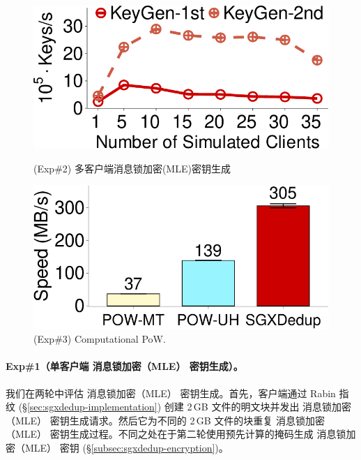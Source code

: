 \begin{figure}[!htb]
  \begin{minipage}[t]{0.47\textwidth}
  \centering
  \includegraphics[width=\linewidth]{pic/sgxdedup/expa3_keyScale_performance_number_multiThread.pdf}
  \caption{(Exp\#2) 多客户端消息锁加密(MLE)密钥生成}
  \label{fig:sgxdedup-exp-keygen-scalability}
  \end{minipage}%
  \hspace{0.2in}
  \begin{minipage}[t]{0.47\textwidth}
  \centering
  \includegraphics[width=\linewidth]{pic/sgxdedup/expa4_powPerformance.pdf}
  \caption{\small(Exp\#3) Computational PoW.}
  \label{fig:sgxdedup-pow-comparison}
  \end{minipage}%
\end{figure}


\paragraph*{Exp\#1（单客户端 消息锁加密（MLE） 密钥生成）。} 我们在两轮中评估 消息锁加密（MLE） 密钥生成。首先，客户端通过 Rabin 指纹 (\S\ref{sec:sgxdedup-implementation}) 创建 2\,GB 文件的明文块并发出 消息锁加密（MLE） 密钥生成请求。然后它为不同的 2\,GB 文件的块重复 消息锁加密（MLE） 密钥生成过程。不同之处在于第二轮使用预先计算的掩码生成 消息锁加密（MLE） 密钥 (\S\ref{subsec:sgxdedup-encryption})。

